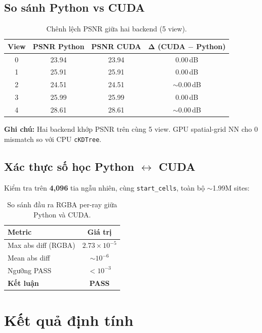 \documentclass[11pt,a4paper]{article}
\begin{document}
\subsection{So sánh Python vs CUDA}

\begin{table}[H]
\centering
\caption{Chênh lệch PSNR giữa hai backend (5 view).}
\label{tab:psnr-compare}
\begin{tabular}{cccc}
\toprule
\textbf{View} & \textbf{PSNR Python} & \textbf{PSNR CUDA} & $\boldsymbol{\Delta}$ \textbf{(CUDA $-$ Python)} \\
\midrule
0 & 23.94 & 23.94 & 0.00\,dB \\
1 & 25.91 & 25.91 & 0.00\,dB \\
2 & 24.51 & 24.51 & $\sim$0.00\,dB \\
3 & 25.99 & 25.99 & 0.00\,dB \\
4 & 28.61 & 28.61 & $\sim$0.00\,dB \\
\bottomrule
\end{tabular}
\end{table}

\noindent\textbf{Ghi chú:} Hai backend khớp PSNR trên cùng 5 view. GPU spatial-grid NN cho 0 mismatch so với CPU \texttt{cKDTree}.

\subsection{Xác thực số học Python $\leftrightarrow$ CUDA}

Kiểm tra trên \textbf{4,096} tia ngẫu nhiên, cùng \texttt{start\_cells}, toàn bộ $\sim$1.99M sites:

\begin{table}[H]
\centering
\caption{So sánh đầu ra RGBA per-ray giữa Python và CUDA.}
\label{tab:numerical}
\begin{tabular}{lc}
\toprule
\textbf{Metric} & \textbf{Giá trị} \\
\midrule
Max abs diff (RGBA) & \textbf{$2.73\times10^{-5}$} \\
Mean abs diff & $\sim 10^{-6}$ \\
Ngưỡng PASS & $< 10^{-3}$ \\
\textbf{Kết luận} & \textbf{PASS} \\
\bottomrule
\end{tabular}
\end{table}

\section{Kết quả định tính}
\end{document}
